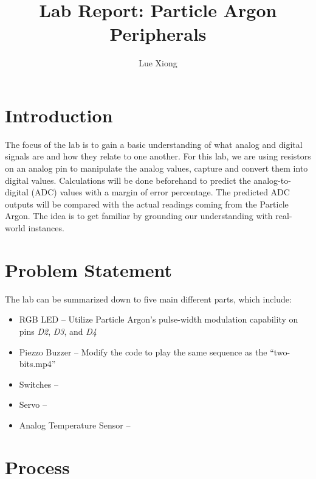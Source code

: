 \documentclass{article}
\title{Lab Report: Particle Argon Peripherals}
\author{Lue Xiong}
\begin{document}
\maketitle
\newpage
\obeylines

\section{Introduction}
The focus of the lab is to gain a basic understanding of what analog and digital signals are and how they relate to one another. For this lab, we are using resistors on an analog pin to manipulate the analog values, capture and convert them into digital values. Calculations will be done beforehand to predict the analog-to-digital (ADC) values with a margin of error percentage. The predicted ADC outputs will be compared with the actual readings coming from the Particle Argon. The idea is to get familiar by grounding our understanding with real-world instances.

\section{Problem Statement}
The lab can be summarized down to five main different parts, which include:

\begin{itemize}
\item RGB LED -- Utilize Particle Argon's pulse-width modulation capability on pins \textit{D2}, \textit{D3}, and \textit{D4}
\item Piezzo Buzzer -- Modify the code to play the same sequence as the “two-bits.mp4”
\item Switches --
\item Servo --
\item Analog Temperature Sensor -- 
\end{itemize}

\section{Process}
\end{document}

